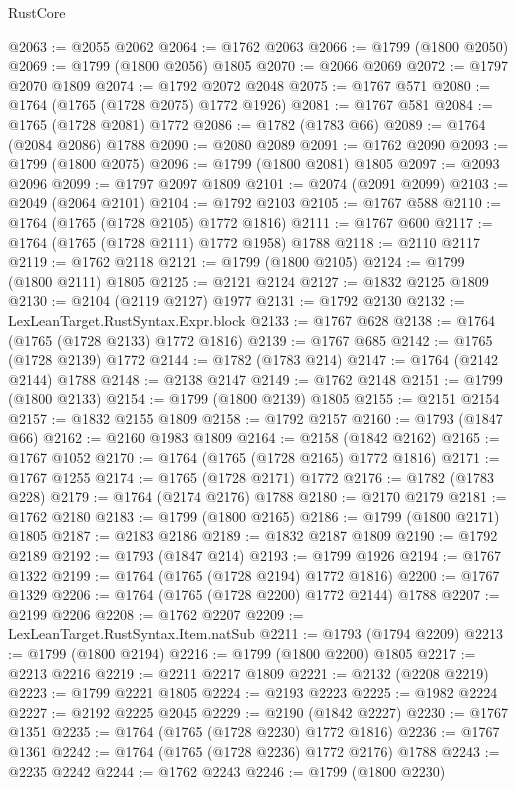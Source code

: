 \begin{lexlean}{RustCore}
\begin{coremodule}
@2063 := @2055 @2062
@2064 := @1762 @2063
@2066 := @1799 (@1800 @2050)
@2069 := @1799 (@1800 @2056) @1805
@2070 := @2066 @2069
@2072 := @1797 @2070 @1809
@2074 := @1792 @2072 @2048
@2075 := @1767 @571
@2080 := @1764 (@1765 (@1728 @2075) @1772 @1926)
@2081 := @1767 @581
@2084 := @1765 (@1728 @2081) @1772
@2086 := @1782 (@1783 @66)
@2089 := @1764 (@2084 @2086) @1788
@2090 := @2080 @2089
@2091 := @1762 @2090
@2093 := @1799 (@1800 @2075)
@2096 := @1799 (@1800 @2081) @1805
@2097 := @2093 @2096
@2099 := @1797 @2097 @1809
@2101 := @2074 (@2091 @2099)
@2103 := @2049 (@2064 @2101)
@2104 := @1792 @2103
@2105 := @1767 @588
@2110 := @1764 (@1765 (@1728 @2105) @1772 @1816)
@2111 := @1767 @600
@2117 := @1764 (@1765 (@1728 @2111) @1772 @1958) @1788
@2118 := @2110 @2117
@2119 := @1762 @2118
@2121 := @1799 (@1800 @2105)
@2124 := @1799 (@1800 @2111) @1805
@2125 := @2121 @2124
@2127 := @1832 @2125 @1809
@2130 := @2104 (@2119 @2127) @1977
@2131 := @1792 @2130
@2132 := LexLeanTarget.RustSyntax.Expr.block
@2133 := @1767 @628
@2138 := @1764 (@1765 (@1728 @2133) @1772 @1816)
@2139 := @1767 @685
@2142 := @1765 (@1728 @2139) @1772
@2144 := @1782 (@1783 @214)
@2147 := @1764 (@2142 @2144) @1788
@2148 := @2138 @2147
@2149 := @1762 @2148
@2151 := @1799 (@1800 @2133)
@2154 := @1799 (@1800 @2139) @1805
@2155 := @2151 @2154
@2157 := @1832 @2155 @1809
@2158 := @1792 @2157
@2160 := @1793 (@1847 @66)
@2162 := @2160 @1983 @1809
@2164 := @2158 (@1842 @2162)
@2165 := @1767 @1052
@2170 := @1764 (@1765 (@1728 @2165) @1772 @1816)
@2171 := @1767 @1255
@2174 := @1765 (@1728 @2171) @1772
@2176 := @1782 (@1783 @228)
@2179 := @1764 (@2174 @2176) @1788
@2180 := @2170 @2179
@2181 := @1762 @2180
@2183 := @1799 (@1800 @2165)
@2186 := @1799 (@1800 @2171) @1805
@2187 := @2183 @2186
@2189 := @1832 @2187 @1809
@2190 := @1792 @2189
@2192 := @1793 (@1847 @214)
@2193 := @1799 @1926
@2194 := @1767 @1322
@2199 := @1764 (@1765 (@1728 @2194) @1772 @1816)
@2200 := @1767 @1329
@2206 := @1764 (@1765 (@1728 @2200) @1772 @2144) @1788
@2207 := @2199 @2206
@2208 := @1762 @2207
@2209 := LexLeanTarget.RustSyntax.Item.natSub
@2211 := @1793 (@1794 @2209)
@2213 := @1799 (@1800 @2194)
@2216 := @1799 (@1800 @2200) @1805
@2217 := @2213 @2216
@2219 := @2211 @2217 @1809
@2221 := @2132 (@2208 @2219)
@2223 := @1799 @2221 @1805
@2224 := @2193 @2223
@2225 := @1982 @2224
@2227 := @2192 @2225 @2045
@2229 := @2190 (@1842 @2227)
@2230 := @1767 @1351
@2235 := @1764 (@1765 (@1728 @2230) @1772 @1816)
@2236 := @1767 @1361
@2242 := @1764 (@1765 (@1728 @2236) @1772 @2176) @1788
@2243 := @2235 @2242
@2244 := @1762 @2243
@2246 := @1799 (@1800 @2230)

\end{coremodule}
\end{lexlean}
